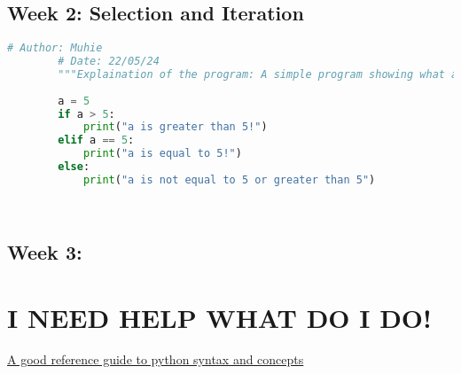 \documentclass{article}
\begin{document}
	 \subsection{Week 2: Selection and Iteration}
	 	 \begin{lstlisting}[language=python]
	 	# Author: Muhie
	 	# Date: 22/05/24
	 	"""Explaination of the program: A simple program showing what a for loop does and what an if statement is"""
	 	
	 	a = 5
	 	if a > 5:
	 		print("a is greater than 5!")
	 	elif a == 5:
	 		print("a is equal to 5!")
	 	else:
	 		print("a is not equal to 5 or greater than 5")
	 	
	 	
	 \end{lstlisting}
	 
	 
	 \subsection{Week 3: }
	 
	
	\section{I NEED HELP WHAT DO I DO!}
	\href{https://www.w3schools.com/python/python_syntax.asp}{A good reference guide to python syntax and concepts}
	
\end{document}

